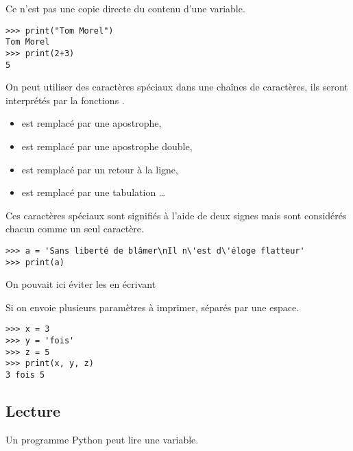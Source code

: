 Ce n'est pas une copie directe du contenu d'une variable.
\begin{lstlisting}
>>> print("Tom Morel")
Tom Morel
>>> print(2+3)
5
\end{lstlisting}
On peut utiliser des caractères spéciaux dans une chaînes de caractères, ils seront interprétés par la fonctions . 
\begin{itemize}
\item {} est remplacé par une apostrophe,
\item {} est remplacé par une apostrophe double,
\item {} est remplacé par un retour à la ligne,
\item {} est remplacé par une tabulation \dots
\end{itemize}
Ces caractères spéciaux sont signifiés à l'aide de deux signes mais sont considérés chacun comme un seul caractère.
\begin{lstlisting}
>>> a = 'Sans liberté de blâmer\nIl n\'est d\'éloge flatteur'
>>> print(a)
\end{lstlisting}

On pouvait ici éviter les  en écrivant 


Si on envoie plusieurs paramètres à imprimer, séparés par une espace.
\begin{lstlisting}
>>> x = 3 
>>> y = 'fois'
>>> z = 5
>>> print(x, y, z)
3 fois 5
\end{lstlisting}
\subsection{Lecture}
Un programme Python peut lire une variable.


